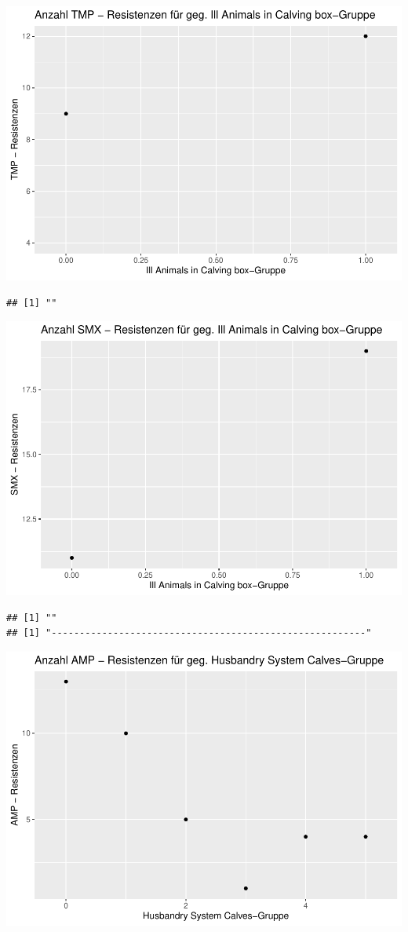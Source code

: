 \documentclass[
]{article}
\begin{document}
\includegraphics{NResistenzen_files/figure-latex/unnamed-chunk-7-29.pdf}

\begin{verbatim}
## [1] ""
\end{verbatim}

\includegraphics{NResistenzen_files/figure-latex/unnamed-chunk-7-30.pdf}

\begin{verbatim}
## [1] ""
## [1] "--------------------------------------------------------"
\end{verbatim}

\includegraphics{NResistenzen_files/figure-latex/unnamed-chunk-7-31.pdf}
\end{document}
